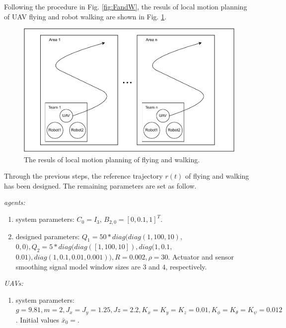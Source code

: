 \documentclass{ieeeaccess}
\begin{document}
Following the procedure in Fig. \ref{fig:FandW}, the resuls of local motion planning of UAV flying and robot walking are shown in Fig. \ref{fig:sim:FandW}.
\begin{figure}[htbp]
    \centering
    \includegraphics[scale=.42]{fig/1.pdf}\caption{The resuls of local motion planning of flying and walking.}%
    \label{fig:sim:FandW}
\end{figure}

Through the previous steps, the reference trajectory $r(t)$ of flying and walking has been designed. The remaining parameters are set as follow.

\textit{agents:}\begin{enumerate}
    \item system parameters: $C_0 = I_3$, $B_{2,0} = [0, 0.1, 1]^T$.
    \item designed parameters: $Q_1 = 50*diag(diag(1,100,10),$\\$ 0, 0), Q_2 = 5*diag(diag([1,100,10]), diag(1,0.1,$\\$0.01), diag(1,0.1,0.01 ,0.001)), R=0.002, \rho=30$. Actuator and sensor smoothing signal model window sizes are $3$ and $4$, respectively.
\end{enumerate}

\textit{UAVs:}\begin{enumerate}
    \item system parameters: $g = 9.81, m = 2,
    J_x = J_y = 1.25, Jz = 2.2,
    K_x = K_y = K_z = 0.01,
    K_\phi = K_\theta = K_\psi = 0.012$. Initial values $\bar{x}_0=$.
\end{enumerate}
\end{document}
